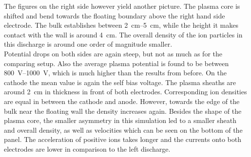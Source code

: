         The figures on the right side however yield another picture. The plasma core is shifted and bend towards the floating boundary above the right hand side electrode. The bulk establishes between \SIrange{2}{5}{\centi\metre}, while the height it makes contact with the wall is around \SI{4}{\centi\metre}. The overall density of the ion particles in this discharge is around one order of magnitude smaller.\\
        Potential drops on both sides are again steep, but not as much as for the comparing setup. Also the average plasma potential is found to be between \SIrange{800}{1000}{\volt}, which is much higher than the results from before. On the cathode the mean value is again the self bias voltage. The plasma sheaths are around \SI{2}{\centi\metre} in thickness in front of both electrodes. Corresponding ion densities are equal in between the cathode and anode. However, towards the edge of the bulk near the floating wall the density increases again. Besides the shape of the plasma core, the smaller asymmetry in this simulation led to a smaller sheath and overall density, as well as velocities which can be seen on the bottom of the panel. The acceleration of positive ions takes longer and the currents onto both electrodes are lower in comparison to the left discharge.
%
        \clearpage
